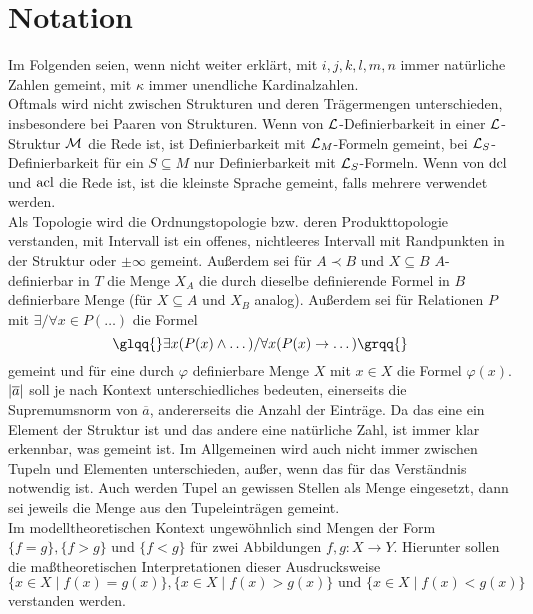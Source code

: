 \chapter*{Notation}
Im Folgenden seien, wenn nicht weiter erklärt, mit $i,j,k,l,m,n$ immer natürliche Zahlen gemeint, mit $\kappa$ immer unendliche Kardinalzahlen.\\
Oftmals wird nicht zwischen Strukturen und deren Trägermengen unterschieden, insbesondere bei Paaren von Strukturen. Wenn von $\mathcal{L}$-Definierbarkeit in einer $\mathcal{L}$-Struktur $\mathcal{M}$ die Rede ist, ist Definierbarkeit mit $\mathcal{L}_M$-Formeln gemeint, bei $\mathcal{L}_S$-Definierbarkeit für ein $S\subseteq M$ nur Definierbarkeit mit $\mathcal{L}_S$-Formeln. Wenn von $\operatorname{dcl}$ und $\operatorname{acl}$ die Rede ist, ist die kleinste Sprache gemeint, falls mehrere verwendet werden.\\
Als Topologie wird die Ordnungstopologie bzw. deren Produkttopologie verstanden, mit \glqq{}Intervall\grqq{} ist ein offenes, nichtleeres Intervall mit Randpunkten in der Struktur oder $\pm\infty$ gemeint. Außerdem sei für $A\prec B$ und $X\subseteq B$ $A$-definierbar in $T$ die Menge $X_A$ die durch dieselbe definierende Formel in $B$ definierbare Menge (für $X\subseteq A$ und $X_B$ analog). Außerdem sei für Relationen $P$ mit \glqq{}$\exists/\forall x\in P(\dots)$\grqq{} die Formel $$\glqq{}\exists x(P(x)\land\dots)/\forall x(P(x)\rightarrow\dots)\grqq{}$$ gemeint und für eine durch $\varphi$ definierbare Menge $X$ mit \glqq{}$x\in X$\grqq{} die Formel $\varphi(x)$.\\
${\left| \overline{a} \right|}$ soll je nach Kontext unterschiedliches bedeuten, einerseits die Supremumsnorm von $\overline{a}$, andererseits die Anzahl der Einträge. Da das eine ein Element der Struktur ist und das andere eine natürliche Zahl, ist immer klar erkennbar, was gemeint ist. Im Allgemeinen wird auch nicht immer zwischen Tupeln und Elementen unterschieden, außer, wenn das für das Verständnis notwendig ist. Auch werden Tupel an gewissen Stellen als Menge eingesetzt, dann sei jeweils die Menge aus den Tupeleinträgen gemeint.\\
Im modelltheoretischen Kontext ungewöhnlich sind Mengen der Form $\{f=g\},\{f>g\}$ und $\{f<g\}$ für zwei Abbildungen $f,g:X\rightarrow Y$. Hierunter sollen die maßtheoretischen Interpretationen dieser Ausdrucksweise $$\{x\in X\mid f(x)=g(x)\},\{x\in X\mid f(x)>g(x)\}\text{ und }\{x\in X\mid f(x)<g(x)\}$$ verstanden werden.